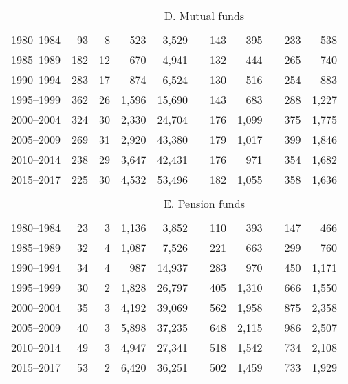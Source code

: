 \documentclass{article}
\begin{document}
\begin{table}[h]
{\begin{tabular}{rrrrrrrrrrr}
            \cline{2-11}
            \\[-2.5ex]
            & \multicolumn{10}{c}{D. Mutual funds} \\ \cline{2-11}
            \\[-2.5ex]
            1980–1984 & 93 & 8 & 523 & 3,529 & & 143 & 395 & & 233 & 538 \\
            1985–1989 & 182 & 12 & 670 & 4,941 & & 132 & 444 & & 265 & 740 \\
            1990–1994 & 283 & 17 & 874 & 6,524 & & 130 & 516 & & 254 & 883 \\
            1995–1999 & 362 & 26 & 1,596 & 15,690 & & 143 & 683 & & 288 & 1,227 \\
            2000–2004 & 324 & 30 & 2,330 & 24,704 & & 176 & 1,099 & & 375 & 1,775 \\
            2005–2009 & 269 & 31 & 2,920 & 43,380 & & 179 & 1,017 & & 399 & 1,846 \\
            2010–2014 & 238 & 29 & 3,647 & 42,431 & & 176 & 971 & & 354 & 1,682 \\
            2015–2017 & 225 & 30 & 4,532 & 53,496 & & 182 & 1,055 & & 358 & 1,636 \\
            
            \cline{2-11}
            \\[-2.5ex]
            & \multicolumn{10}{c}{E. Pension funds} \\ \cline{2-11}
            \\[-2.5ex]
            1980–1984 & 23 & 3 & 1,136 & 3,852 & & 110 & 393 & & 147 & 466 \\
            1985–1989 & 32 & 4 & 1,087 & 7,526 & & 221 & 663 & & 299 & 760 \\
            1990–1994 & 34 & 4 & 987 & 14,937 & & 283 & 970 & & 450 & 1,171 \\
            1995–1999 & 30 & 2 & 1,828 & 26,797 & & 405 & 1,310 & & 666 & 1,550 \\
            2000–2004 & 35 & 3 & 4,192 & 39,069 & & 562 & 1,958 & & 875 & 2,358 \\
            2005–2009 & 40 & 3 & 5,898 & 37,235 & & 648 & 2,115 & & 986 & 2,507 \\
            2010–2014 & 49 & 3 & 4,947 & 27,341 & & 518 & 1,542 & & 734 & 2,108 \\
            2015–2017 & 53 & 2 & 6,420 & 36,251 & & 502 & 1,459 & & 733 & 1,929 \\
            

\end{tabular}}
\end{table}
\end{document}
